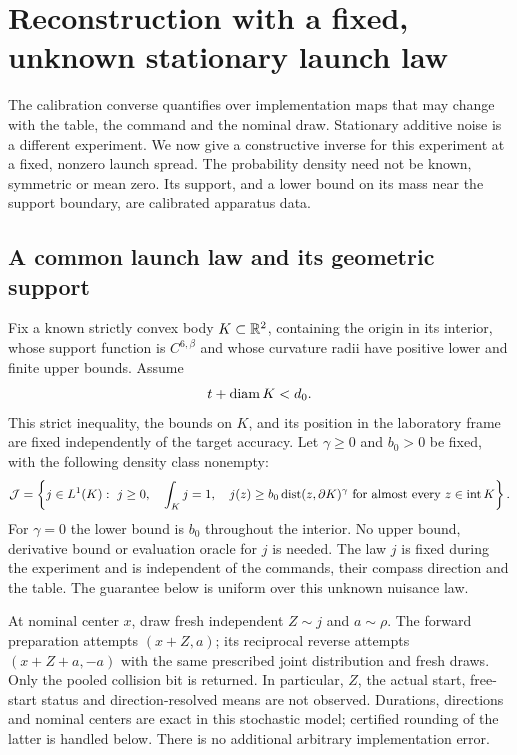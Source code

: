 \section{Reconstruction with a fixed, unknown stationary launch law}
\label{sec:stationary}
The calibration converse quantifies over implementation maps that may
change with the table, the command and the nominal draw. Stationary
additive noise is a different experiment. We now give a constructive
inverse for this experiment at a fixed, nonzero launch spread. The
probability density need not be known, symmetric or mean zero. Its
support, and a lower bound on its mass near the support boundary, are
calibrated apparatus data.

\subsection{A common launch law and its geometric support}
Fix a known strictly convex body $K\subset\mathbb R^2$, containing the origin
in its interior, whose support function is $C^{6,\beta}$ and whose
curvature radii have positive lower and finite upper bounds. Assume
\begin{equation}\label{eq:fixed-footprint}
                       t+\operatorname{diam} K<d_0.
\end{equation}
This strict inequality, the bounds on $K$, and its position in the
laboratory frame are fixed independently of the target accuracy.
Let $\gamma\ge0$ and $b_0>0$ be fixed, with the following density class
nonempty:
\begin{equation}\label{eq:jitter-class}
 \mathcal J=\left\{j\in L^1(K):\ j\ge0,\quad\int_Kj=1,\quad
 j(z)\ge b_0\operatorname{dist}(z,\partial K)^\gamma
                  \text{ for almost every }z\in\operatorname{int}K\right\}.
\end{equation}
For $\gamma=0$ the lower bound is $b_0$ throughout the interior. No
upper bound, derivative bound or evaluation oracle for $j$ is needed.
The law $j$ is fixed during the experiment and is independent of the
commands, their compass direction and the table. The guarantee below
is uniform over this unknown nuisance law.

At nominal center $x$, draw fresh independent $Z\sim j$ and $a\sim\rho$.
The forward preparation attempts $(x+Z,a)$; its reciprocal reverse
attempts $(x+Z+a,-a)$ with the same prescribed joint distribution and
fresh draws. Only the pooled collision bit is returned. In particular,
$Z$, the actual start, free-start status and direction-resolved means
are not observed. Durations, directions and nominal centers are exact
in this stochastic model; certified rounding of the latter is handled
below. There is no additional arbitrary implementation error.

